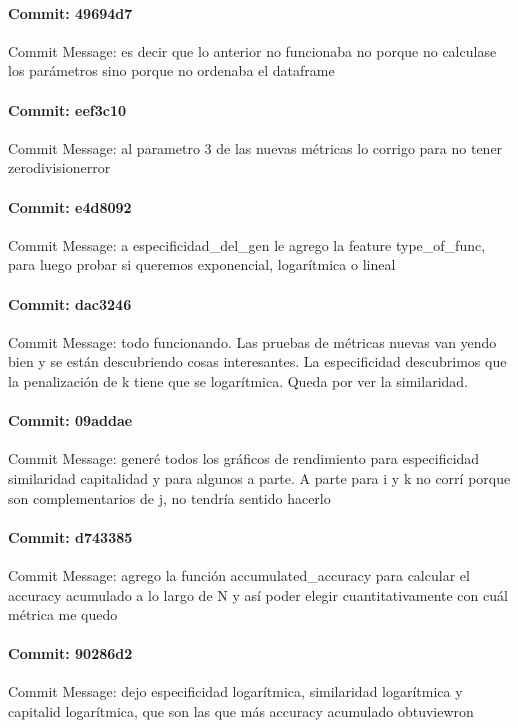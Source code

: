 \documentclass{article}
\begin{document}
\paragraph{Commit: 49694d7}
Commit Message: es decir que lo anterior no funcionaba no porque no calculase los parámetros sino porque no ordenaba el dataframe

\paragraph{Commit: eef3c10}
Commit Message: al parametro 3 de las nuevas métricas lo corrigo para no tener zerodivisionerror

\paragraph{Commit: e4d8092}
Commit Message: a especificidad_del_gen le agrego la feature type_of_func, para luego probar si queremos exponencial, logarítmica o lineal

\paragraph{Commit: dac3246}
Commit Message: todo funcionando. Las pruebas de métricas nuevas van yendo bien y se están descubriendo cosas interesantes. La especificidad descubrimos que la penalización de k tiene que se logarítmica. Queda por ver la similaridad.

\paragraph{Commit: 09addae}
Commit Message: generé todos los gráficos de rendimiento para especificidad similaridad capitalidad y para algunos a parte. A parte para i y k no corrí porque son complementarios de j, no tendría sentido hacerlo

\paragraph{Commit: d743385}
Commit Message: agrego la función accumulated_accuracy para calcular el accuracy acumulado a lo largo de N y así poder elegir cuantitativamente con cuál métrica me quedo

\paragraph{Commit: 90286d2}
Commit Message: dejo especificidad logarítmica, similaridad logarítmica y capitalid logarítmica, que son las que más accuracy acumulado obtuviewron
\end{document}
